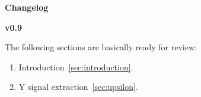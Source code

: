 {\noindent\bf\Large Changelog}

\begingroup
\fontsize{7pt}{12pt}\selectfont

{\bf v0.9}

The following sections are basically ready for review:
\begin{enumerate}
\item Introduction~\ref{sec:introduction}.
\item Y signal extraction~\ref{sec:upsilon}.
\end{enumerate}
\endgroup
